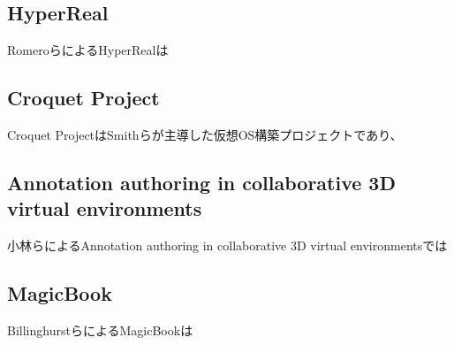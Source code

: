 \subsection{HyperReal}
RomeroらによるHyperRealは\cite{10.1145/900051.900055}

\subsection{Croquet Project}
Croquet Project\cite{10.5555/1009376.1009395}はSmithらが主導した仮想OS構築プロジェクトであり、

\subsection{Annotation authoring in collaborative 3D virtual environments}
小林らによるAnnotation authoring in collaborative 3D virtual environments\cite{10.1145/1152399.1152452}では

\subsection{MagicBook}
BillinghurstらによるMagicBook\cite{10.1145/634067.634087}は




